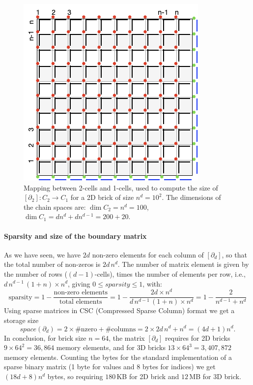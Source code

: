 \begin{figure}[htbp] %
    \centering
        \includegraphics[width=0.3\linewidth]{figs/grid2.png} 
   \caption{Mapping between 2-cells and 1-cells, used to compute the size of $[\partial_2]: C_2\to C_1$ for a 2D brick of size $n^d = 10^2$. The dimensions of the chain spaces are: $\dim C_2 = n^d = 100$, $\dim C_1 = dn^d + dn^{d-1} = 200+20$.  }
\end{figure}

\paragraph{Sparsity and size of the boundary matrix }\label{sec:bm-size}

As we have seen, we have $2d$ non-zero elements for each column of $[\partial_d]$, so that the total number of non-zeros is $2d\,n^d$. The number of matrix element is given by the number of rows ($(d-1)$-cells), times the number of elements per row, i.e., $d\,n^{d-1}\,(1+n) \times n^d$, giving $0 \leq sparsity \leq 1$, with: 
\[
\mbox{sparsity} = 1 - 
\frac{\mbox{non-zero\ elements}}{\mbox{total\ elements}} =  1 - 
\frac{2d\times n^d}{d\,n^{d-1}\,(1+n) \times n^d} =  1 - 
\frac{2}{n^{d-1}+n^d}
\]
Using sparse matrices in CSC (Compressed Sparse Column) format we get a storage size
\[
space(\partial_d) = 2\times \#\mbox{nzero} + \#\mbox{columns} = 2\times 2d\,n^d + n^d = (4d+1)n^d.
\]
In conclusion, for brick size $n=64$, the matrix $[\partial_d]$ requires for 2D bricks $9\times 64^2=36,864$ memory elements, and for 3D bricks $13\times 64^3=3,407,872$ memory elements. Counting the bytes for the standard implementation of a sparse binary matrix (1 byte for values and 8 bytes for indices) we get 
$(18d + 8) n^d$ bytes, so requiring $180$\,KB for 2D brick and $12$\,MB for 3D brick.





